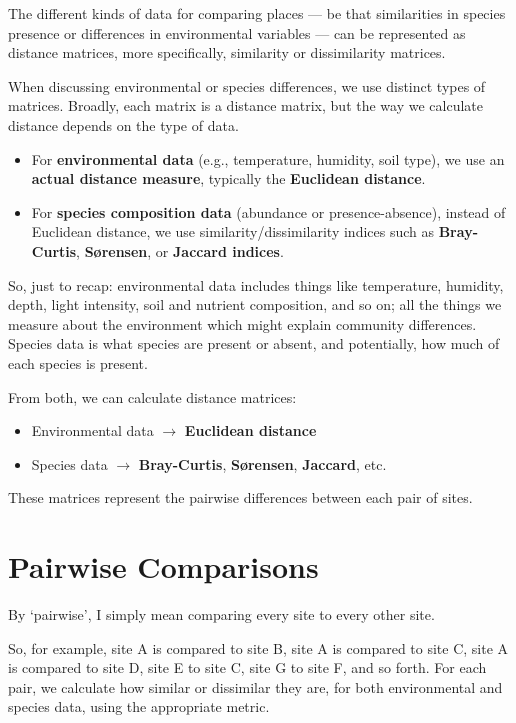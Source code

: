 \documentclass[
  12pt,
]{book}
\providecommand{\tightlist}{%
  \setlength{\itemsep}{0pt}\setlength{\parskip}{0pt}}
\begin{document}
The different kinds of data for comparing places --- be that
similarities in species presence or differences in environmental
variables --- can be represented as distance matrices, more
specifically, similarity or dissimilarity matrices.

When discussing environmental or species differences, we use distinct
types of matrices. Broadly, each matrix is a distance matrix, but the
way we calculate distance depends on the type of data.

\begin{itemize}
\tightlist
\item
  For \textbf{environmental data} (e.g., temperature, humidity, soil
  type), we use an \textbf{actual distance measure}, typically the
  \textbf{Euclidean distance}.
\item
  For \textbf{species composition data} (abundance or presence-absence),
  instead of Euclidean distance, we use similarity/dissimilarity indices
  such as \textbf{Bray-Curtis}, \textbf{Sørensen}, or \textbf{Jaccard
  indices}.
\end{itemize}

So, just to recap: environmental data includes things like temperature,
humidity, depth, light intensity, soil and nutrient composition, and so
on; all the things we measure about the environment which might explain
community differences. Species data is what species are present or
absent, and potentially, how much of each species is present.

From both, we can calculate distance matrices:

\begin{itemize}
\tightlist
\item
  Environmental data \(\rightarrow\) \textbf{Euclidean distance}
\item
  Species data \(\rightarrow\) \textbf{Bray-Curtis}, \textbf{Sørensen},
  \textbf{Jaccard}, etc.
\end{itemize}

These matrices represent the pairwise differences between each pair of
sites.

\section{Pairwise Comparisons}\label{pairwise-comparisons}

By `pairwise', I simply mean comparing every site to every other site.

So, for example, site A is compared to site B, site A is compared to
site C, site A is compared to site D, site E to site C, site G to site
F, and so forth. For each pair, we calculate how similar or dissimilar
they are, for both environmental and species data, using the appropriate
metric.
\end{document}
